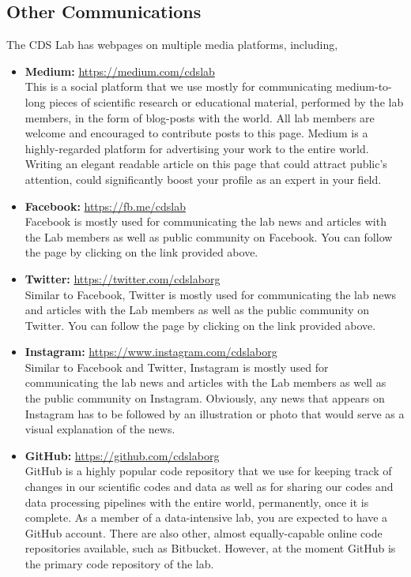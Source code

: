 \subsection{Other Communications}
\label{sec:communication:other}

    The CDS Lab has webpages on multiple media platforms, including,

    \begin{itemize}

        \item
            {\bf Medium:} \url{https://medium.com/cdslab} \\
            This is a social platform that we use mostly for communicating medium-to-long pieces of scientific research or educational material, performed by the lab members, in the form of blog-posts with the world. All lab members are welcome and encouraged to contribute posts to this page. Medium is a highly-regarded platform for advertising your work to the entire world. Writing an elegant readable article on this page that could attract public's attention, could significantly boost your profile as an expert in your field.

        \item
            {\bf Facebook:} \url{https://fb.me/cdslab} \\
            Facebook is mostly used for communicating the lab news and articles with the Lab members as well as public community on Facebook. You can follow the page by clicking on the link provided above.

        \item
            {\bf Twitter:} \url{https://twitter.com/cdslaborg} \\
            Similar to Facebook, Twitter is mostly used for communicating the lab news and articles with the Lab members as well as the public community on Twitter. You can follow the page by clicking on the link provided above.

        \item
            {\bf Instagram:} \url{https://www.instagram.com/cdslaborg} \\
            Similar to Facebook and Twitter, Instagram is mostly used for communicating the lab news and articles with the Lab members as well as the public community on Instagram. Obviously, any news that appears on Instagram has to be followed by an illustration or photo that would serve as a visual explanation of the news.

        \item
            {\bf GitHub:} \url{https://github.com/cdslaborg} \\
            GitHub is a highly popular code repository that we use for keeping track of changes in our scientific codes and data as well as for sharing our codes and data processing pipelines with the entire world, permanently, once it is complete. As a member of a data-intensive lab, you are expected to have a GitHub account. There are also other, almost equally-capable online code repositories available, such as Bitbucket. However, at the moment GitHub is the primary code repository of the lab.


\end{itemize}
